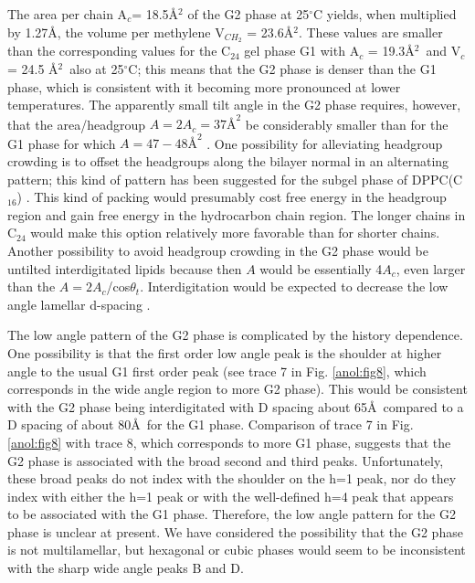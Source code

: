 
The area per chain A$_c$= 18.5\AA$^2$ of the G2 phase at
25$^{\circ}$C yields, when multiplied by 1.27\AA, the volume per
methylene V$_{CH_{2}}$ = 23.6\AA$^2$. These values are smaller than the corresponding
values for the C$_{24}$ gel phase G1 with A$_c$ = 19.3\AA$^2$\ and V$_c$ = 24.5
\AA$^2$\ also at 25$^{\circ}$C; this means that the G2 phase
is denser than the G1 phase, which is consistent with it becoming more
pronounced at lower temperatures.  The apparently small tilt angle in
the G2 phase requires, however, that the
area/headgroup $A = 2A_c = 37\mbox{\AA}^2$ be considerably smaller than for the 
G1 phase for which $A = 47-48\mbox{\AA}^2$ \cite{STN92}.  One possibility for alleviating 
headgroup crowding is to offset the headgroups along the bilayer
normal in an alternating pattern; this kind of pattern has been suggested
for the subgel phase of DPPC(C$_{16}$) \cite{RuoS82A}.  This kind of packing would presumably 
cost free energy in the headgroup region and gain free energy in the
hydrocarbon chain region.   The longer chains in C$_{24}$ would make this
option relatively more favorable than for shorter chains.
Another possibility to avoid headgroup crowding in the G2 phase
would be untilted interdigitated lipids because then $A$ would 
be essentially 4$A_c$, even larger than the $A = 2A_c$/cos$\theta_{t}$.  
Interdigitation would be expected to decrease the low angle lamellar 
d-spacing \cite{McI84}.  

The low angle pattern of the G2 phase is complicated by the history
dependence.  One possibility is that the first order low angle peak is the
shoulder at higher angle to the usual G1 first order peak (see trace 7 in
Fig. \ref{anol:fig8}, which corresponds in the wide angle region to more G2 phase).  
This would be consistent with the G2 phase being interdigitated
with D spacing about 65\AA\ compared to a D spacing of about 80\AA\
for the G1 phase.  Comparison of trace 7 in Fig. \ref{anol:fig8} with trace 8, which
corresponds to more G1 phase, suggests that the G2 phase is associated with the 
broad second and third peaks.  Unfortunately,
these broad peaks do not index with the shoulder on the h=1 peak, nor do
they index with either the h=1 peak or with the well-defined h=4 peak that
appears to be
associated with the G1 phase. Therefore, the low angle pattern for the
G2 phase is unclear at present.  We have considered the possibility that the
G2 phase is not multilamellar, but hexagonal or cubic phases would seem to
be inconsistent with the sharp wide angle peaks B and D.  

